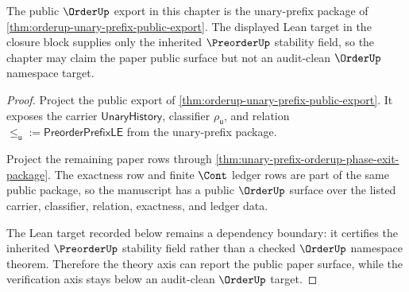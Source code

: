 \begin{theorem}
\label{thm:orderup-public-export-formal-boundary}
The public $\OrderUp$ export in this chapter is the unary-prefix package of \autoref{thm:orderup-unary-prefix-public-export}. The displayed Lean target in the closure block supplies only the inherited $\PreorderUp$ stability field, so the chapter may claim the paper public surface but not an audit-clean $\OrderUp$ namespace target.
\end{theorem}
\begin{proof}
Project the public export of \autoref{thm:orderup-unary-prefix-public-export}. It exposes the carrier $\mathsf{UnaryHistory}$, classifier $\rho_{\mathsf{u}}$, and relation $\le_{\mathsf{u}} := \mathsf{PreorderPrefixLE}$ from the unary-prefix package.

Project the remaining paper rows through \autoref{thm:unary-prefix-orderup-phase-exit-package}. The exactness row and finite $\Cont$ ledger rows are part of the same public package, so the manuscript has a public $\OrderUp$ surface over the listed carrier, classifier, relation, exactness, and ledger data.

The Lean target recorded below remains a dependency boundary: it certifies the inherited $\PreorderUp$ stability field rather than a checked $\OrderUp$ namespace theorem. Therefore the theory axis can report the public paper surface, while the verification axis stays below an audit-clean $\OrderUp$ target.
\end{proof}

